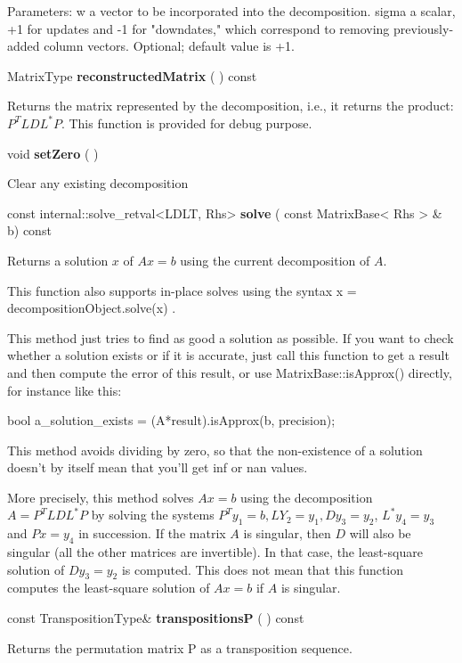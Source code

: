 Parameters: w a vector to be incorporated into the decomposition.  
sigma a scalar, +1 for updates and -1 for "downdates," which correspond to removing previously-added column vectors. Optional; default value is +1.  


\vspace{0.3cm}
MatrixType \textbf{reconstructedMatrix}  ( )  const 

Returns the matrix represented by the decomposition, i.e., it returns the product: $P^T L D L^* P$. This function is provided for debug purpose. 

\vspace{0.3cm}
void \textbf{setZero}  ( )   

Clear any existing decomposition 

\vspace{0.3cm}
const internal::solve\_retval<LDLT, Rhs> \textbf{solve}  ( const MatrixBase< Rhs > \&  b)  const 

Returns a solution $x$ of $A x = b$ using the current decomposition of $A$.

This function also supports in-place solves using the syntax x = decompositionObject.solve(x) .

This method just tries to find as good a solution as possible. If you want to check whether a solution exists or if it is accurate, just call this function to get a result and then compute the error of this result, or use MatrixBase::isApprox() directly, for instance like this:

bool a\_solution\_exists = (A*result).isApprox(b, precision); 

This method avoids dividing by zero, so that the non-existence of a solution doesn't by itself mean that you'll get inf or nan values.

More precisely, this method solves  $A x = b$  using the decomposition $A = P^T L D L^* P$ by solving the systems $P^T y_1 = b, L Y_2 = y_1, D y_3 = y_2$, $L^* y_4 = y_3$ and $P x = y_4$ in succession. If the matrix $A$ is singular, then $D$ will also be singular (all the other matrices are invertible). In that case, the least-square solution of $D y_3 = y_2$ is computed. This does not mean that this function computes the least-square solution of $A x = b$ if $A$ is singular.


\vspace{0.3cm}
const TranspositionType\& \textbf{transpositionsP}  ( )  const 

Returns the permutation matrix P as a transposition sequence. 

